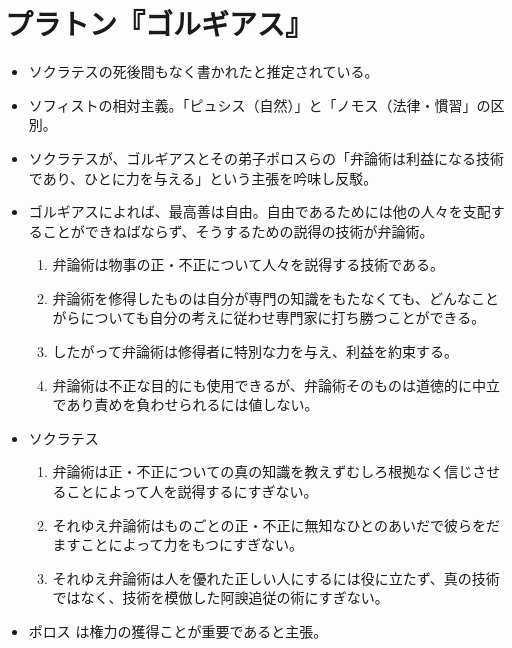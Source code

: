 \documentclass{jsarticle}
\begin{document}
\section{プラトン『ゴルギアス』}
\begin{itemize}
\item ソクラテスの死後間もなく書かれたと推定されている。

\item ソフィストの相対主義。「ピュシス（自然）」と「ノモス（法律・慣習」の区別。

\item ソクラテスが、ゴルギアスとその弟子ポロスらの「弁論術は利益になる技術であり、ひとに力を与える」という主張を吟味し反駁。

\item ゴルギアスによれば、最高善は自由。自由であるためには他の人々を支配することができねばならず、そうするための説得の技術が弁論術。

  \begin{enumerate}
  \item 弁論術は物事の正・不正について人々を説得する技術である。
  \item 弁論術を修得したものは自分が専門の知識をもたなくても、どんなことがらについても自分の考えに従わせ専門家に打ち勝つことができる。
  \item したがって弁論術は修得者に特別な力を与え、利益を約束する。
  \item 弁論術は不正な目的にも使用できるが、弁論術そのものは道徳的に中立であり責めを負わせられるには値しない。
  \end{enumerate}


\item ソクラテス
  \begin{enumerate}
  \item 弁論術は正・不正についての真の知識を教えずむしろ根拠なく信じさせることによって人を説得するにすぎない。
  \item それゆえ弁論術はものごとの正・不正に無知なひとのあいだで彼らをだますことによって力をもつにすぎない。
  \item それゆえ弁論術は人を優れた正しい人にするには役に立たず、真の技術ではなく、技術を模倣した阿諛追従の術にすぎない。
  \end{enumerate}

\item ポロス
  は権力の獲得ことが重要であると主張。



\end{itemize}
\end{document}
